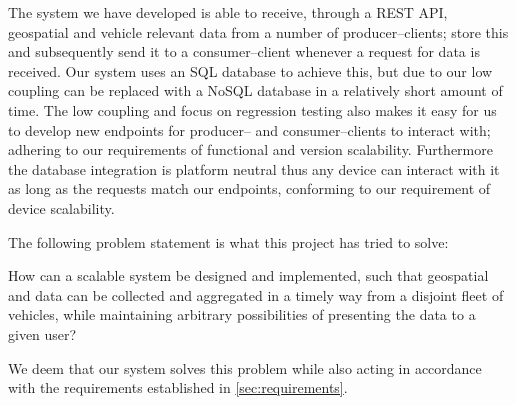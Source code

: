 \bigskip \noindent
The system we have developed is able to receive, through a REST API, geospatial and vehicle relevant data from a number of producer--clients; store this and subsequently send it to a consumer--client whenever a request for data is received.
Our system uses an SQL database to achieve this, but due to our low coupling can be replaced with a NoSQL database in a relatively short amount of time.
The low coupling and focus on regression testing also makes it easy for us to develop new endpoints for producer-- and consumer--clients to interact with; adhering to our requirements of functional and version scalability.
Furthermore the database integration is platform neutral thus any device can interact with it as long as the requests match our endpoints, conforming to our requirement of device scalability.

The following problem statement is what this project has tried to solve:


\medskip
{\addtolength{\leftskip}{10mm}\addtolength{\rightskip}{10mm}\noindent\hrulefill\it

\noindent How can a scalable system be designed and implemented,
such that geospatial and data can be collected and aggregated in a timely way from a disjoint fleet of vehicles,
while maintaining arbitrary possibilities of presenting the data to a given user?

\noindent\hrulefill

}

We deem that our system solves this problem while also acting in accordance with the requirements established in \cref{sec:requirements}.
